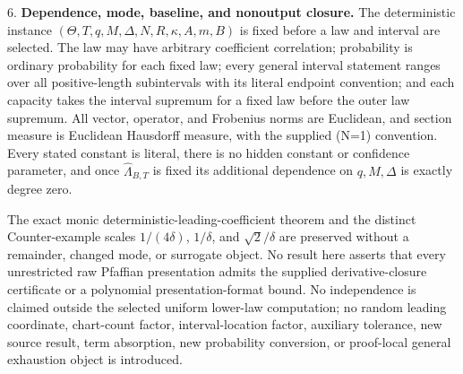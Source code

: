 \begin{proposition}
6. \textbf{Dependence, mode, baseline, and nonoutput closure.} The deterministic instance
   \((\Theta,T,q,M,\Delta,N,R,\kappa,A,m,B)\) is fixed before a law and interval are selected. The law may have
   arbitrary coefficient correlation; probability is ordinary probability for each fixed law; every general
   interval statement ranges over all positive-length subintervals with its literal endpoint convention; and
   each capacity takes the interval supremum for a fixed law before the outer law supremum. All vector,
   operator, and Frobenius norms are Euclidean, and section measure is Euclidean Hausdorff measure, with the
   supplied (N=1) convention. Every stated constant is literal, there is no hidden constant or confidence
   parameter, and once \(\widehat\Lambda_{B,T}\) is fixed its additional dependence on \(q,M,\Delta\) is exactly
   degree zero.

   The exact monic deterministic-leading-coefficient theorem and the distinct Counter-example scales
   \(1/(4\delta)\), \(1/\delta\), and \(\sqrt2/\delta\) are preserved without a remainder, changed mode,
   or surrogate object. No result here asserts that every unrestricted raw Pfaffian presentation admits the
   supplied derivative-closure certificate or a polynomial presentation-format bound. No independence is
   claimed outside the selected uniform lower-law computation; no random leading coordinate, chart-count
   factor, interval-location factor, auxiliary tolerance, new source result, term absorption, new probability
   conversion, or proof-local general exhaustion object is introduced.


\end{proposition}


